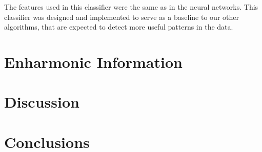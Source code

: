\documentclass{article}
\begin{document}
The features used in this classifier were the same as in the neural
networks. This classifier was designed and implemented to serve as a
baseline to our other algorithms, that are expected to detect more
useful patterns in the data.




\section{Enharmonic Information}
\label{sec:enharmonic}



\section{Discussion}
\label{sec:discussion}



\section{Conclusions}
\label{sec:conclusions}




\end{document}
